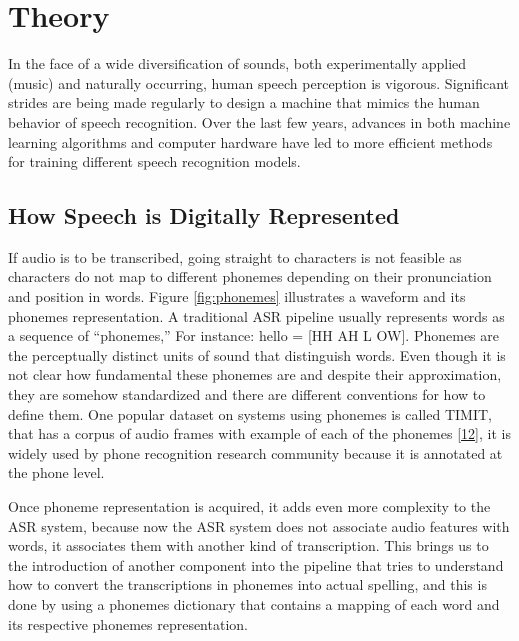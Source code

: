 \documentclass[
  a4paper,
]{article}
\begin{document}
\newpage

\hypertarget{theory}{%
\section{Theory}\label{theory}}

In the face of a wide diversification of sounds, both experimentally
applied (music) and naturally occurring, human speech perception is
vigorous. Significant strides are being made regularly to design a
machine that mimics the human behavior of speech recognition. Over the
last few years, advances in both machine learning algorithms and
computer hardware have led to more efficient methods for training
different speech recognition models.

\hypertarget{how-speech-is-digitally-represented}{%
\subsection{How Speech is Digitally
Represented}\label{how-speech-is-digitally-represented}}

If audio is to be transcribed, going straight to characters is not
feasible as characters do not map to different phonemes depending on
their pronunciation and position in words. Figure \ref{fig:phonemes}
illustrates a waveform and its phonemes representation. A traditional
ASR pipeline usually represents words as a sequence of ``phonemes,'' For
instance: hello = {[}HH AH L OW{]}. Phonemes are the perceptually
distinct units of sound that distinguish words. Even though it is not
clear how fundamental these phonemes are and despite their
approximation, they are somehow standardized and there are different
conventions for how to define them. One popular dataset on systems using
phonemes is called TIMIT, that has a corpus of audio frames with example
of each of the phonemes \protect\hyperlink{ref-timit}{{[}12{]}}, it is
widely used by phone recognition research community because it is
annotated at the phone level.

Once phoneme representation is acquired, it adds even more complexity to
the ASR system, because now the ASR system does not associate audio
features with words, it associates them with another kind of
transcription. This brings us to the introduction of another component
into the pipeline that tries to understand how to convert the
transcriptions in phonemes into actual spelling, and this is done by
using a phonemes dictionary that contains a mapping of each word and its
respective phonemes representation.
\end{document}
